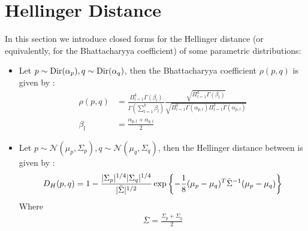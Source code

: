 \documentclass[../main.tex]{subfiles}
\begin{document}
\section{Hellinger Distance}
In this section we introduce closed forms for the Hellinger distance (or equivalently, for the Bhattacharyya coefficient) of some parametric distributions:
\begin{itemize}
\item Let $p \sim \text{Dir}(\mathbf{\alpha}_p), q \sim \text{Dir}(\mathbf{\alpha}_q)$, then the Bhattacharyya coefficient $\rho(p, q)$ is given by \cite{Rauber2008}:
\begin{align*}
\rho(p, q) &= \frac{\Pi_{l=1}^k\Gamma(\beta_l)}{\Gamma(\sum_{l=1}^k\beta_l)}\frac{\sqrt{\Pi_{l=1}^k\Gamma(\beta_l)}}{\sqrt{\Pi_{l=1}^k\Gamma(\alpha_{p,l})\Pi_{l=1}^k\Gamma(\alpha_{p,l})}}\\
\beta_l &= \frac{\alpha_{p,l}+\alpha_{q,l}}{2}
\end{align*}
\item Let $p \sim \mathcal{N}(\mu_p, \Sigma_p), q \sim \mathcal{N}(\mu_q, \Sigma_q)$, then the Hellinger distance between is given by \cite{Dasgupta}:
\begin{align*}
D_H(p, q) = 1 - \frac{\lvert\Sigma_p\rvert^{1/4}\lvert\Sigma_q\rvert^{1/4}}{\lvert\bar{\Sigma}\rvert^{1/2}}\exp{\left\{-\frac{1}{8}(\mu_p-\mu_q)^T\bar{\Sigma}^{-1}(\mu_p-\mu_q)\right\}}\\
\end{align*}
Where
\begin{align*}
\bar{\Sigma} = \frac{\Sigma_p+\Sigma_q}{2}
\end{align*}

\end{itemize}
\end{document}
